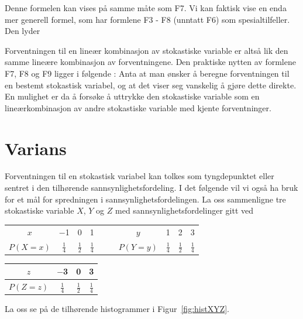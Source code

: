 \noindent Denne formelen kan vises på samme måte som F7. Vi kan faktisk
vise en enda mer generell formel, som har formlene F3 - F8
(unntatt F6) som spesialtilfeller. Den lyder

\begin{center}  \end{center}                      

                                 
Forventningen til en lineær kombinasjon av stokastiske variable
er altså lik den samme lineære kombinasjon av forventningene.
Den praktiske nytten av formlene F7, F8 og F9 ligger i følgende :
Anta at man ønsker å beregne forventningen til en bestemt
stokastisk variabel, og at det viser seg vanskelig å gjøre dette
direkte. En mulighet er da å forsøke å uttrykke den stokastiske
variable som en lineærkombinasjon av andre stokastiske variable
med kjente forventninger.


\section{Varians}

Forventningen til en stokastisk variabel kan tolkes som tyngdepunktet eller 
sentret i den tilhørende sannsynlighetsfordeling. I
det følgende vil vi også ha bruk for et mål for spredningen i
sannsynlighetsfordelingen. La oss sammenligne tre stokastiske
variable $X$, $Y$ og $Z$ med sannsynlighetsfordelinger gitt ved
\begin{center}
\begin{tabular}{c|cccccc|ccc}
  $x$& $-$1 & 0 & 1 & & &$y$& 1 & 2 & 3  \\ \cline{1-4} \cline{7-10}
 $P(X=x)$&$\frac{1}{4}$&$\frac{1}{2}$&$\frac{1}{4}$& & &
         $P(Y=y)$&$\frac{1}{4}$&$\frac{1}{2}$&$\frac{1}{4}$
\end{tabular}
 \vspace{1cm}
\begin{tabular}{c|ccc}
$z$& $-$3 & 0 & 3  \\ \hline
 $P(Z=z)$&$\frac{1}{4}$&$\frac{1}{2}$&$\frac{1}{4}$
\end{tabular}
\end{center}
\noindent La oss se på de tilhørende histogrammer i Figur~\ref{fig:histXYZ}.

